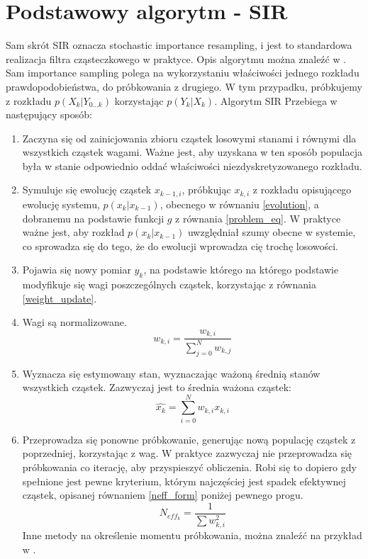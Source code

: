 \section{Podstawowy algorytm - SIR} \label{basic_algorithm}
Sam skrót SIR oznacza stochastic importance resampling, i jest to standardowa realizacja filtra cząsteczkowego w praktyce. Opis algorytmu można znaleźć w \cite{wiki_pf}. Sam importance sampling polega na wykorzystaniu właściwości jednego rozkładu prawdopodobieństwa, do próbkowania z drugiego. W tym przypadku, próbkujemy z rozkładu $p(X_k|Y_{0...k})$ korzystając $p(Y_k|X_k)$.
Algorytm SIR Przebiega w następujący sposób:
\begin{enumerate}[label=(\alph*)]
	\item Zaczyna się od zainicjowania zbioru cząstek losowymi stanami i równymi dla wszystkich cząstek wagami. Ważne jest, aby uzyskana w ten sposób populacja była w stanie odpowiednio oddać właściwości niezdyskretyzowanego rozkładu. \label{pf_init_step}
	
	\item Symuluje się ewolucję cząstek $x_{k-1,i}$, próbkując $x_{k,i}$ z rozkładu opisującego ewolucję systemu, $p(x_k|x_{k-1})$, obecnego w równaniu \ref{evolution}, a dobranemu na podstawie funkcji $g$ z równania \ref{problem_eq}. W praktyce ważne jest, aby rozkład $p(x_k|x_{k-1})$ uwzględniał szumy obecne w systemie, co sprowadza się do tego, że do ewolucji wprowadza cię trochę losowości. \label{pf_drift_step}
	
	\item Pojawia się nowy pomiar $y_k$, na podstawie którego na którego podstawie modyfikuje się wagi poszczególnych cząstek, korzystając z równania \ref{weight_update}. \label{pf_reweight_step}

	\item Wagi są normalizowane. \label{pf_weight_normalization_step}
	\begin{equation}
		w_{k,i}=\frac{w_{k,i}}{\sum_{j=0}^{N} w_{k,j}}
	\end{equation}

	\item Wyznacza się estymowany stan, wyznaczając ważoną średnią stanów wszystkich cząstek. Zazwyczaj jest to średnia ważona cząstek: \label{pf_est_step}
	\begin{equation}
		\hat{x_k} = \sum_{i=0}^{N} w_{k,i} x_{k,i}
	\end{equation}
	\item Przeprowadza się ponowne próbkowanie, generując nową populację cząstek z poprzedniej, korzystając z wag. W praktyce zazwyczaj nie przeprowadza się próbkowania co iterację, aby przyspieszyć obliczenia. Robi się to dopiero gdy spełnione jest pewne kryterium, którym najczęściej jest spadek efektywnej cząstek, opisanej równaniem \ref{neff_form} poniżej pewnego progu.
	\begin{equation}\label{neff_form}
		N_{eff_k} = \dfrac{1}{\sum w_{k,i}^2}
	\end{equation}
	Inne metody na określenie momentu próbkowania, można znaleźć na przykład w \cite{adaptive_resampling}.\label{resampling_step}
\end{enumerate}

